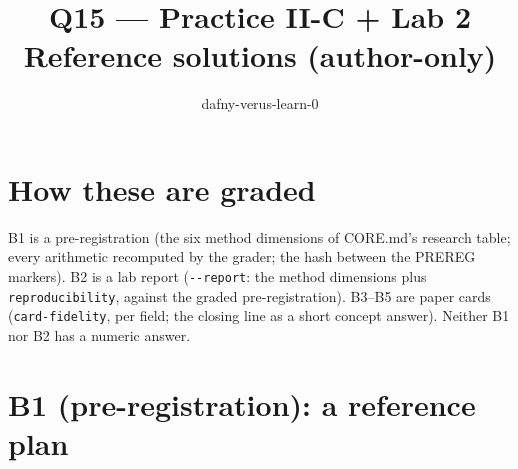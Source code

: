 \documentclass[11pt]{article}
\title{Q15 --- Practice II-C + Lab 2 \\ \large Reference solutions (author-only)}
\author{dafny-verus-learn-0}
\date{}
\begin{document}
\maketitle
\sloppy

\section*{How these are graded}
B1 is a pre-registration (the six method dimensions of CORE.md's research
table; every arithmetic recomputed by the grader; the hash between the PREREG
markers). B2 is a lab report (\verb+--report+: the method dimensions plus
\texttt{reproducibility}, against the graded pre-registration). B3--B5 are
paper cards (\texttt{card-fidelity}, per field; the closing line as a short
concept answer). Neither B1 nor B2 has a numeric answer.

\section*{B1 (pre-registration): a reference plan}
\end{document}
